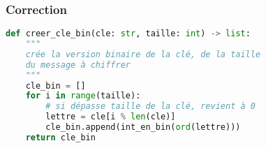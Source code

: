 \documentclass[svgnames,11pt]{beamer}
\begin{document}
\begin{frame}[fragile]
    \frametitle{Correction}

\begin{center}
\begin{lstlisting}[language=Python , basicstyle=\ttfamily\small, xleftmargin=0.2em, xrightmargin=0em]
def creer_cle_bin(cle: str, taille: int) -> list:
    """
    crée la version binaire de la clé, de la taille
    du message à chiffrer
    """
    cle_bin = []
    for i in range(taille):
        # si dépasse taille de la clé, revient à 0
        lettre = cle[i % len(cle)]
        cle_bin.append(int_en_bin(ord(lettre)))
    return cle_bin
\end{lstlisting}
\end{center}   

\end{frame}
\end{document}
